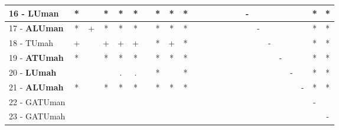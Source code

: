 \begin{table}[h]
\begin{center}
\begin{tabular}{lcc|cc|cc|cc|cc|cc|cc|cc|cc|cc|cc|c}
16 - \textbf{LUman}	& * &   & * & * & * &   & * & * & * &   &   &   &   &   &   & - &   &   &   &   &   & * & * \\ \hline
17 - \textbf{ALUman}	& * & + & * & * & * &   & * & * & * &   &   &   &   &   &   &   & - &   &   &   &   & * & * \\
18 - TUmah	& + &   & + & + & + &   & * & + & * &   &   &   &   &   &   &   &   & - &   &   &   & * & * \\ \hline
19 - \textbf{ATUmah}	& * &   & * & * & * &   & * & * & * &   &   &   &   &   &   &   &   &   & - &   &   & * & * \\
20 - \textbf{LUmah}	&   &   &   & . & . &   & * &   & * &   &   &   &   &   &   &   &   &   &   & - &   & * & * \\ \hline
21 - \textbf{ALUmah}	& * &   & * & * & * &   & * & * & * &   &   &   &   &   &   &   &   &   &   &   & - & * & * \\
22 - GATUman	&   &   &   &   &   &   &   &   &   &   &   &   &   &   &   &   &   &   &   &   &   & - &   \\ \hline
23 - GATUmah	&   &   &   &   &   &   &   &   &   &   &   &   &   &   &   &   &   &   &   &   &   &   & - \\\end{tabular}
\label{stratsALCKappaFried5NN}
\end{center}
\end{table}